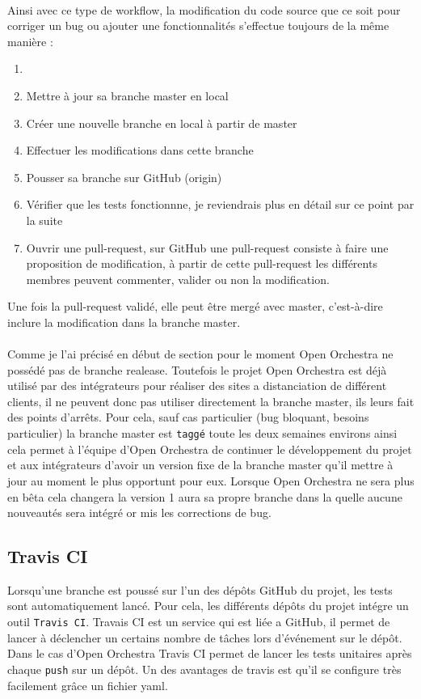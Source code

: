 \paragraph{}
Ainsi avec ce type de workflow, la modification du code source que ce soit pour corriger un bug ou ajouter une fonctionnalités s'effectue toujours de la même manière : 
\begin{enumerate}
\item[]
\item Mettre à jour sa branche master en local
\item Créer une nouvelle branche en local à partir de master
\item Effectuer les modifications dans cette branche
\item Pousser sa branche sur GitHub (origin)
\item Vérifier que les tests fonctionnne, je reviendrais plus en détail sur ce point par la suite
\item Ouvrir une pull-request, sur GitHub une pull-request consiste à faire une proposition de modification, à partir de cette pull-request les différents membres peuvent commenter, valider ou non la modification.
\end{enumerate}

Une fois la pull-request validé, elle peut être mergé avec master, c'est-à-dire inclure la modification dans la branche master.
\paragraph{}
Comme je l'ai précisé en début de section pour le moment Open Orchestra ne possédé pas de branche realease. Toutefois le projet Open Orchestra est déjà utilisé par des intégrateurs pour réaliser des sites a distanciation de différent clients, il ne peuvent donc pas utiliser directement la branche master, ils leurs fait des points d'arrêts. Pour cela, sauf cas particulier (bug bloquant, besoins particulier) la branche master est \verb?taggé? toute les deux semaines environs ainsi cela permet à l'équipe d'Open Orchestra de continuer le développement  du projet et aux intégrateurs d'avoir un version fixe de la branche master qu'il mettre à jour au moment le plus opportunt pour eux.  Lorsque Open Orchestra ne sera plus en bêta cela changera la version 1 aura sa propre branche dans la quelle aucune nouveautés sera intégré or mis les corrections de bug.

\subsection{Travis CI}
Lorsqu'une branche est poussé sur l'un des dépôts GitHub du projet, les tests sont automatiquement lancé. Pour cela, les différents dépôts du projet intégre un outil \verb?Travis CI?. Travais CI est un service qui est liée a GitHub, il permet de lancer à déclencher un certains nombre de tâches lors d'événement sur le dépôt. Dans le cas d'Open Orchestra Travis CI permet de lancer les tests unitaires après chaque \verb?push? sur un dépôt. Un des avantages de travis est qu'il se configure très facilement grâce un fichier yaml.
